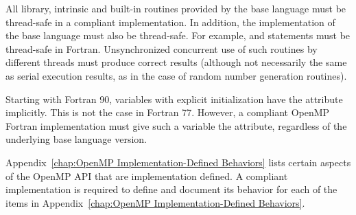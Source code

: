 All library, intrinsic and built-in routines provided by the base language must be
thread-safe in a compliant implementation. In addition, the implementation of the base 
language must also be thread-safe. For example,  and  
statements must be thread-safe in Fortran. Unsynchronized concurrent use of such 
routines by different threads must produce correct results (although not necessarily the 
same as serial execution results, as in the case of random number generation routines).

Starting with Fortran 90, variables with explicit initialization have the  attribute 
implicitly. This is not the case in Fortran 77. However, a compliant OpenMP Fortran 
implementation must give such a variable the  attribute, regardless of the 
underlying base language version.

Appendix~\ref{chap:OpenMP Implementation-Defined Behaviors} 
lists certain aspects of the OpenMP API that are implementation defined. A 
compliant implementation is required to define and document its behavior for each of 
the items in Appendix~\ref{chap:OpenMP Implementation-Defined Behaviors}.






